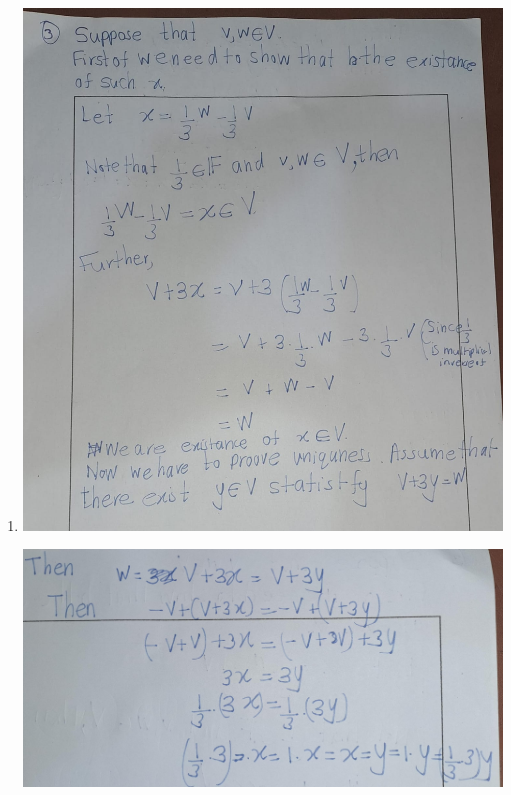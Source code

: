 \documentclass[
]{book}
\theoremstyle{definition}
\theoremstyle{definition}
\theoremstyle{definition}
\theoremstyle{definition}
\theoremstyle{remark}
\begin{document}
\begin{enumerate}
\def\labelenumi{\arabic{enumi}.}
\setcounter{enumi}{2}
\item
  \includegraphics{fig/Ex1B/Ex3-1.jpg}

  \includegraphics{fig/Ex1B/Ex3-2.jpg}
\end{enumerate}
\end{document}
